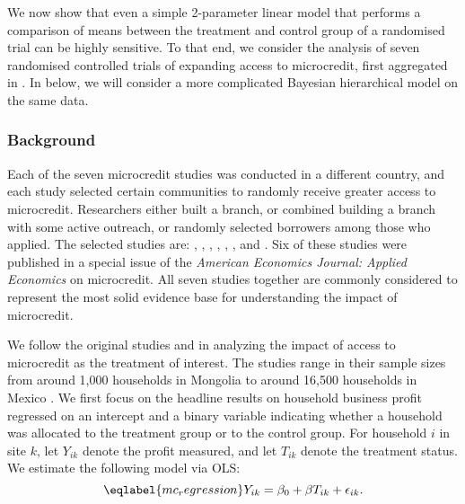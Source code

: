 We now show that even a simple 2-parameter linear model that performs a
comparison of means between the treatment and control group of a randomised
trial can be highly sensitive. To that end, we consider the analysis of seven
randomised controlled trials of expanding access to microcredit, first
aggregated in \citet{meager2019understanding}.  In
 below, we will consider a more
complicated Bayesian hierarchical model on the same data.

\subsubsection{Background}
Each of the seven microcredit studies was conducted in a different country, and
each study selected certain communities to randomly receive greater access to
microcredit. Researchers either built a branch, or combined building a branch
with some active outreach, or randomly selected borrowers among those who
applied. The selected studies are:
%
\citet{angelucci2015microcredit}, \citet{attanasio2015impacts},
\citet{augsburg2015impacts}, \citet{banerjee2015miracle},
\citet{crepon2015estimating}, \citet{karlan2011microcredit}, and
\citet{tarozzi2015impacts}.
%
Six of these studies were published in a special issue of the \emph{American
Economics Journal: Applied Economics} on microcredit. All seven studies together
are commonly considered to represent the most solid evidence base for
understanding the impact of microcredit.

We follow the original studies and \citet{meager2019understanding} in analyzing
the impact of access to microcredit as the treatment of interest. The studies
range in their sample sizes from around 1,000 households in Mongolia
\citep{attanasio2015impacts} to around 16,500 households in Mexico
\citep{angelucci2015microcredit}. We first focus on the headline results on
household business profit regressed on an intercept and a binary variable
indicating whether a household was allocated to the treatment group or to the
control group. For household $i$ in site $k$, let $Y_{ik}$ denote the profit
measured, and let $T_{ik}$ denote the treatment status. We estimate the
following model via OLS:
%
\begin{equation}\eqlabel{mc_regression}
	Y_{ik} = \beta_0 + \beta T_{ik} + \epsilon_{ik}.
\end{equation}

